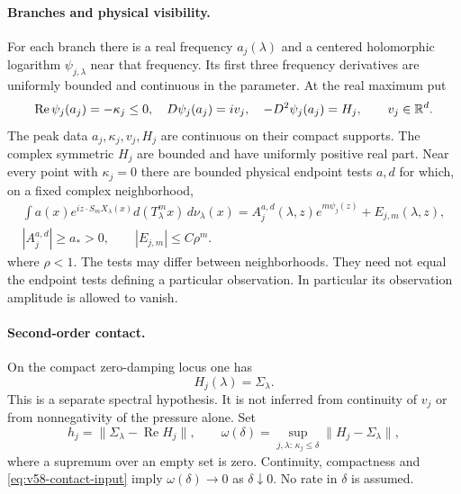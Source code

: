 \paragraph{Branches and physical visibility.}
For each branch there is a real frequency $a_j(\lambda)$ and a
centered holomorphic logarithm $\psi_{j,\lambda}$ near that frequency.
Its first three frequency derivatives are uniformly bounded and
continuous in the parameter. At the real maximum put
\begin{equation}\label{eq:v58-abstract-peak}
 \operatorname{Re}\psi_j(a_j)=-\kappa_j\le0,\quad
 D\psi_j(a_j)=iv_j,\quad
 -D^2\psi_j(a_j)=H_j,\qquad v_j\in\R^d.
\end{equation}
The peak data $a_j,\kappa_j,v_j,H_j$ are continuous on their compact
supports. The complex symmetric $H_j$ are bounded and have uniformly
positive real part. Near every point with $\kappa_j=0$ there are bounded
physical endpoint tests $a,d$ for which, on a fixed complex
neighborhood,
\begin{equation}\label{eq:v58-visibility-input}
 \begin{gathered}
 \int a(x)e^{iz\cdot S_mX_\lambda(x)}d(T_\lambda^m x)
                  \,d\nu_\lambda(x)
       =A_j^{a,d}(\lambda,z)e^{m\psi_j(z)}+E_{j,m}(\lambda,z),\\
 |A_j^{a,d}|\ge a_*>0,\qquad |E_{j,m}|\le C\rho^m.
 \end{gathered}
\end{equation}
where $\rho<1$. The tests may differ between neighborhoods. They
need not equal the endpoint tests defining a particular observation.
In particular its observation amplitude is allowed to vanish.

\paragraph{Second-order contact.}
On the compact zero-damping locus one has
\begin{equation}\label{eq:v58-contact-input}
                         H_j(\lambda)=\Sigma_\lambda.
\end{equation}
This is a separate spectral hypothesis. It is not inferred from
continuity of $v_j$ or from nonnegativity of the pressure alone.
Set
\[
 h_j=\|\Sigma_\lambda-\operatorname{Re}H_j\|,\qquad
 \omega(\delta)=\sup_{j,\lambda:\,\kappa_j\le\delta}
                         \|H_j-\Sigma_\lambda\|,
\]
where a supremum over an empty set is zero. Continuity, compactness
and \eqref{eq:v58-contact-input} imply $\omega(\delta)\to0$ as
$\delta\downarrow0$. No rate in $\delta$ is assumed.

